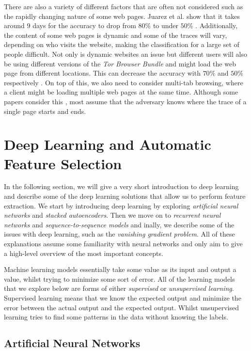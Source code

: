 There are also a variety of different factors that are often not considered such as the rapidly changing nature of some web pages.
Juarez et al. show that it takes around $9$ days for the accuracy to drop from $80\%$ to under $50\%$ \cite{wfpevaluation}.
Additionally, the content of some web pages is dynamic and some of the traces will vary, depending on who visits the website, making the classification for a large set of people difficult.
Not only is dynamic websites an issue but different users will also be using different versions of the \textit{Tor Browser Bundle} and might load the web page from different locations.
This can decrease the accuracy with $70\%$ and $50\%$ respectively \cite{wfpevaluation}.
On top of this, we also need to consider multi-tab browsing, where a client might be loading multiple web pages at the same time.
Although some papers consider this \cite{naivebayes}, most assume that the adversary knows where the trace of a single page starts and ends.

\section{Deep Learning and Automatic Feature Selection}

In the following section, we will give a very short introduction to deep learning and describe some of the deep learning solutions that allow us to perform feature extraction.
We start by introducing deep learning by exploring \textit{artificial neural networks} and \textit{stacked autoencoders}.
Then we move on to \textit{recurrent neural networks} and \textit{sequence-to-sequence models}
and inally, we describe some of the issues with deep learning, such as the \textit{vanishing gradient problem}.
All of these explanations assume some familiarity with neural networks and only aim to give a high-level overview of the most important concepts.

Machine learning models essentially take some value as its input and output a value, whilst trying to minimize some sort of error.
All of the learning models that we explore below are forms of either \textit{supervised} or \textit{unsupervised learning}.
Supervised learning means that we know the expected output and minimize the error between the actual output and the expected output.
Whilst unsupervised learning tries to find some patterns in the data without knowing the labels.

\subsection{Artificial Neural Networks}

